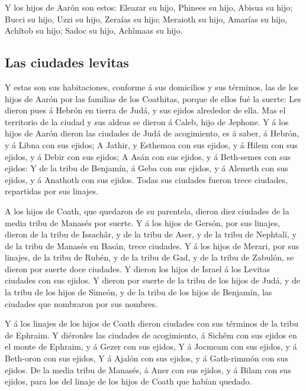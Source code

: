  Y los hijos de Aarón son estos: Eleazar su hijo, Phinees
su hijo, Abisua su hijo;  Bucci su hijo, Uzzi su hijo,
Zeraías su hijo;  Meraioth su hijo, Amarías su hijo,
Achîtob su hijo;  Sadoc su hijo, Achîmaas su hijo.

\hypertarget{las-ciudades-levitas}{%
\subsection{Las ciudades levitas}\label{las-ciudades-levitas}}

 Y estas son sus habitaciones, conforme á sus domicilios
y sus términos, las de los hijos de Aarón por las familias de los
Coathitas, porque de ellos fué la suerte:  Les dieron
pues á Hebrón en tierra de Judá, y sus ejidos alrededor de ella.
 Mas el territorio de la ciudad y sus aldeas se dieron á
Caleb, hijo de Jephone.  Y á los hijos de Aarón dieron
las ciudades de Judá de acogimiento, es á saber, á Hebrón, y á Libna con
sus ejidos;  A Jathir, y Esthemoa con sus ejidos, y á
Hilem con sus ejidos, y á Debir con sus ejidos;  A Asán
con sus ejidos, y á Beth-semes con sus ejidos:  Y de la
tribu de Benjamín, á Geba con sus ejidos, y á Alemeth con sus ejidos, y
á Anathoth con sus ejidos. Todas sus ciudades fueron trece ciudades,
repartidas por sus linajes.

 A los hijos de Coath, que quedaron de su parentela,
dieron diez ciudades de la media tribu de Manasés por suerte.
 Y á los hijos de Gersón, por sus linajes, dieron de la
tribu de Issachâr, y de la tribu de Aser, y de la tribu de Nephtalí, y
de la tribu de Manasés en Basán, trece ciudades.  Y á los
hijos de Merari, por sus linajes, de la tribu de Rubén, y de la tribu de
Gad, y de la tribu de Zabulón, se dieron por suerte doce ciudades.
 Y dieron los hijos de Israel á los Levitas ciudades con
sus ejidos.  Y dieron por suerte de la tribu de los hijos
de Judá, y de la tribu de los hijos de Simeón, y de la tribu de los
hijos de Benjamín, las ciudades que nombraron por sus nombres.

 Y á los linajes de los hijos de Coath dieron ciudades
con sus términos de la tribu de Ephraim.  Y diéronles las
ciudades de acogimiento, á Sichêm con sus ejidos en el monte de Ephraim,
y á Gezer con sus ejidos,  Y á Jocmeam con sus ejidos, y
á Beth-oron con sus ejidos,  Y á Ajalón con sus ejidos, y
á Gath-rimmón con sus ejidos.  De la media tribu de
Manasés, á Aner con sus ejidos, y á Bilam con sus ejidos, para los del
linaje de los hijos de Coath que habían quedado.

